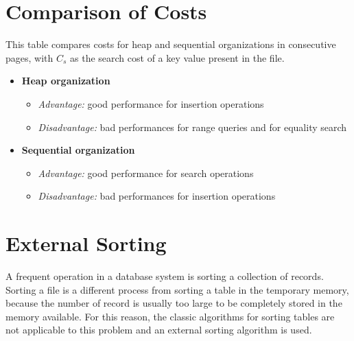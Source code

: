 \section{Comparison of Costs}
This table compares costs for heap and sequential organizations in consecutive pages, with \(C_s\) as the search cost of a key value present in the file.
\begin{itemize}
    \item \textbf{Heap organization}
    \begin{itemize}
        \item \textit{Advantage:} good performance for insertion operations
        \item \textit{Disadvantage:} bad performances for range queries and for equality search
    \end{itemize}
    \item \textbf{Sequential organization}
    \begin{itemize}
        \item \textit{Advantage:} good performance for search operations
        \item \textit{Disadvantage:} bad performances for insertion operations
    \end{itemize}
\end{itemize}

\section{External Sorting}
A frequent operation in a database system is sorting a collection of records. Sorting a file is a different process from sorting a table in the temporary memory, because the number of record is usually too large to be completely stored in the memory available. For this reason, the classic algorithms for sorting tables are not applicable to this problem and an external sorting algorithm is used.

